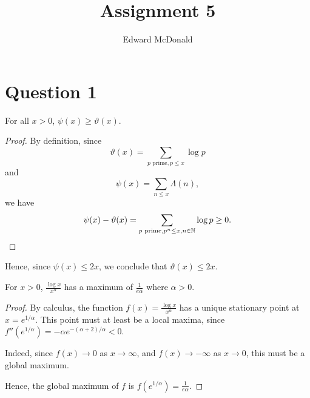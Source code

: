 \documentclass{unswmaths}
\begin{document}
\subject{Number Theory}
\author{Edward McDonald}
\title{Assignment 5}


\setlength\parindent{0pt}

\newcommand{\Unit}{\mathbb{U}}
\newcommand{\modulo}[1]{\;\operatorname{mod}\;#1}
\newcommand{\pprime}{{p\text{ prime}}}

\unswtitle{}


\section*{Question 1}
\begin{lemma}
    For all $x > 0$, $\psi(x) \geq \vartheta(x)$.
\end{lemma}
\begin{proof}
    By definition, since
    \begin{equation*}
        \vartheta(x) = \sum_{\pprime, p \leq x} \log{p}
    \end{equation*}
    and
    \begin{equation*}
        \psi(x) = \sum_{n \leq x} \Lambda(n),
    \end{equation*}
    we have
    \begin{equation*}
        \psi(x) - \vartheta(x) = \sum_{\pprime, p^n \leq x, n \in \Ntrl} \log{p} \geq 0.
    \end{equation*}
\end{proof}
Hence, since $\psi(x) \leq 2x$, we conclude that $\vartheta(x) \leq 2x$.
\begin{lemma}
\label{logInequality}
    For $x > 0$, $\frac{\log{x}}{x^\alpha}$ has a maximum of $\frac{1}{e\alpha}$ where $\alpha > 0$. 
\end{lemma}
\begin{proof}
    By calculus, the function $f(x) = \frac{\log{x}}{x^\alpha}$ has a unique stationary point at $x = e^{1/\alpha}$. This point
    must at least be a local maxima, since $f''(e^{1/\alpha}) = -\alpha e^{-(\alpha+2)/\alpha} < 0$. 
    
    Indeed, since $f(x) \rightarrow 0$ as $x \rightarrow \infty$, and $f(x) \rightarrow -\infty$ as $x\rightarrow 0$, this
    must be a global maximum. 
    
    Hence, the global maximum of $f$ is $f(e^{1/\alpha}) = \frac{1}{e\alpha}$. 
\end{proof}
\end{document}
